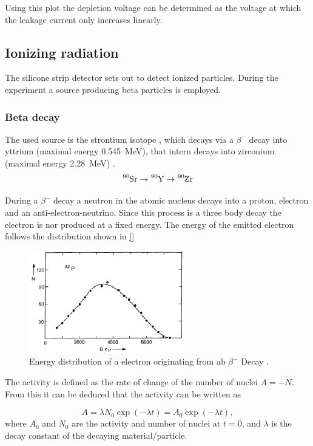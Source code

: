 Using this plot the depletion voltage can be determined as the voltage at which the leakage current only increases linearly.

\subsection{Ionizing radiation}
The silicone strip detector sets out to detect ionized particles. During the experiment a source producing beta particles is employed.
\subsubsection{Beta decay}
The used source is the strontium isotope , which decays via a $\beta^-$ decay into yttrium (maximal energy \qty{0.545}{\mega\eV}), that intern decays into zirconium (maximal energy \qty{2.28}{\mega\eV}) \cite{lab}.
\begin{equation}
	\ce{^{90}Sr} \rightarrow \ce{^{90}Y} \rightarrow \ce{^{90}Zr}
\end{equation}

During a $\beta^-$ decay a neutron in the atomic nucleus decays into a proton, electron and an anti-electron-neutrino. Since this process is a three body decay the electron is nor produced at a fixed energy. The energy of the emitted electron follows the distribution shown in \autoref{}


\begin{figure}
	\centering
	\includegraphics[width=0.7\linewidth]{Assets/edist.png}
	\caption{Energy distribution of a electron originating from ab $\beta^-$ Decay \cite{lab}.}
	\label{fig:edist}
\end{figure}

The activity is defined as the rate of change of the number of nuclei $A = - \dot{N}$. From this it can be deduced that the activity can be written as

\begin{equation}
	A = \lambda N_0 \exp(-\lambda t) = A_0 \exp(-\lambda t),
\end{equation}
where $A_0$ and $N_0$ are the activity and number of nuclei at $t=0$, and $\lambda$ is the decay constant of the decaying material/particle.

